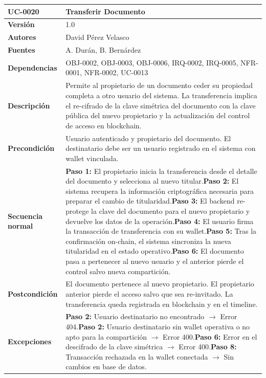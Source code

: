 \documentclass[11pt, a4paper]{article}
\begin{document}
\begin{longtable}{|p{4cm}|p{10cm}|}
\hline
\textbf{UC-0020} & Transferir Documento \\
\hline
\textbf{Versión} & 1.0 \\
\hline
\textbf{Autores} & David Pérez Velasco \\
\hline
\textbf{Fuentes} & A. Durán, B. Bernárdez \\
\hline
\textbf{Dependencias} & OBJ-0002, OBJ-0003, OBJ-0006, IRQ-0002, IRQ-0005, NFR-0001, NFR-0002, UC-0013 \\
\hline
\textbf{Descripción} & Permite al propietario de un documento ceder su propiedad completa a otro usuario del sistema. La transferencia implica el re-cifrado de la clave simétrica del documento con la clave pública del nuevo propietario y la actualización del control de acceso en blockchain. \\
\hline
\textbf{Precondición} & Usuario autenticado y propietario del documento. El destinatario debe ser un usuario registrado en el sistema con wallet vinculada. \\
\hline
\textbf{Secuencia normal} & \textbf{Paso 1:} El propietario inicia la transferencia desde el detalle del documento y selecciona al nuevo titular.\newline\textbf{Paso 2:} El sistema recupera la información criptográfica necesaria para preparar el cambio de titularidad.\newline\textbf{Paso 3:} El backend re-protege la clave del documento para el nuevo propietario y devuelve los datos de la operación.\newline\textbf{Paso 4:} El usuario firma la transacción de transferencia con su wallet.\newline\textbf{Paso 5:} Tras la confirmación on-chain, el sistema sincroniza la nueva titularidad en el estado operativo.\newline\textbf{Paso 6:} El documento pasa a pertenecer al nuevo usuario y el anterior pierde el control salvo nueva compartición. \\
\hline
\textbf{Postcondición} & El documento pertenece al nuevo propietario. El propietario anterior pierde el acceso salvo que sea re-invitado. La transferencia queda registrada en blockchain y en el timeline. \\
\hline
\textbf{Excepciones} & \textbf{Paso 2:} Usuario destinatario no encontrado $\rightarrow$ Error 404.\newline\textbf{Paso 2:} Usuario destinatario sin wallet operativa o no apto para la compartición $\rightarrow$ Error 400.\newline\textbf{Paso 6:} Error en el descifrado de la clave simétrica $\rightarrow$ Error 400.\newline\textbf{Paso 8:} Transacción rechazada en la wallet conectada $\rightarrow$ Sin cambios en base de datos. \\

\end{longtable}
\end{document}
